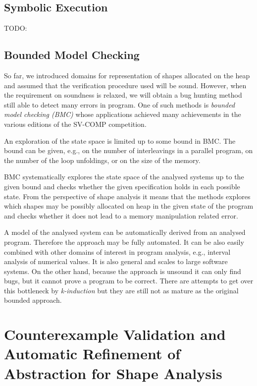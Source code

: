           \subsection{Symbolic Execution}
          TODO:

	  \subsection{Bounded Model Checking}

	  So far, we introduced domains for representation of shapes allocated on the heap and
	  assumed that the verification procedure used will be sound.
	  However, when the requirement on soundness is relaxed, we will obtain a bug hunting method
	  still able to detect many errors in program.
	  One of such methods is \emph{bounded model checking (BMC)} whose applications achieved many achievements
	  in the various editions of the SV-COMP competition.

	  An exploration of the state space is limited up to some bound in BMC.
	  The bound can be given, e.g., on the number of interleavings in a parallel program,
	  on the number of the loop unfoldings, or on the size of the memory.
	  
	  BMC systematically explores the state space of the analysed systems up
	  to the given bound and checks whether the given specification holds in each possible state.
	  From the perspective of shape analysis it means that the methods explores which shapes
	  may be possibly allocated on heap in the given state of the program
	  and checks whether it does not lead to a memory manipulation related error.
	  
	  A model of the analysed system can be automatically derived from an analysed program.
	  Therefore the approach may be fully automated.
	  It can be also easily combined with other domains of interest in program analysis,
	  e.g., interval analysis of numerical values.
	  It is also general and scales to large software systems.
	  On the other hand, because the approach is unsound it can only find bugs,
	  but it cannot prove a program to be correct.
	  There are attempts to get over this bottleneck by \emph{k-induction} but they are still not as mature
	  as the original bounded approach.

	  \section{Counterexample Validation and Automatic Refinement of Abstraction for Shape Analysis}

